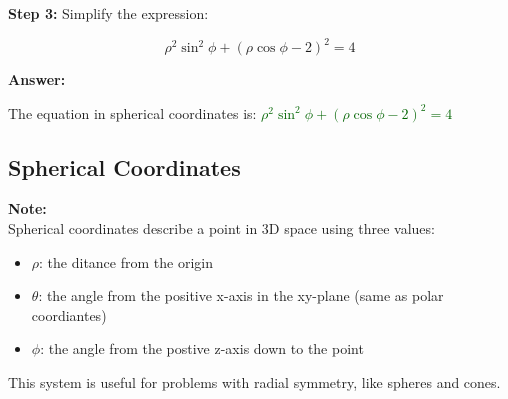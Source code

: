 \documentclass[10pt]{article}                               %
\begin{document}
\begin{adjustwidth}{2em}{0pt}
\begin{adjustwidth}{2em}{0pt}
\begin{examplebox}
\begin{adjustwidth}{2em}{0pt}
                \vspace{0.5em}
            
                \textbf{Step 3:} Simplify the expression:
                \vspace{0.25em}
            
                \[
                \rho^2\sin^2\phi + (\rho\cos\phi - 2)^2 = 4
                \]
            
                \vspace{0.5em}
            
                \textbf{Answer:}
                \vspace{0.25em}
            
                The equation in spherical coordinates is:  
                \textcolor{darkgreen}{\( \rho^2\sin^2\phi + (\rho\cos\phi - 2)^2 = 4 \)}
            
            \end{adjustwidth}
        
        \end{examplebox}

    \end{adjustwidth}


    \subsection*{Spherical Coordinates}

    \begin{adjustwidth}{2em}{0pt}

        \begin{notebox}

            \textbf{Note:} \\
            Spherical coordinates describe a point in 3D space using three values:
                    
            \begin{itemize}
                \item \( \rho \): the ditance from the origin
                \item \( \theta \): the angle from the positive x-axis in the xy-plane (same as polar coordiantes)
                \item \( \phi \): the angle from the postive z-axis down to the point
            \end{itemize}

            This system is useful for problems with radial symmetry, like spheres and cones.


\end{notebox}
\end{adjustwidth}
\end{adjustwidth}
\end{document}
